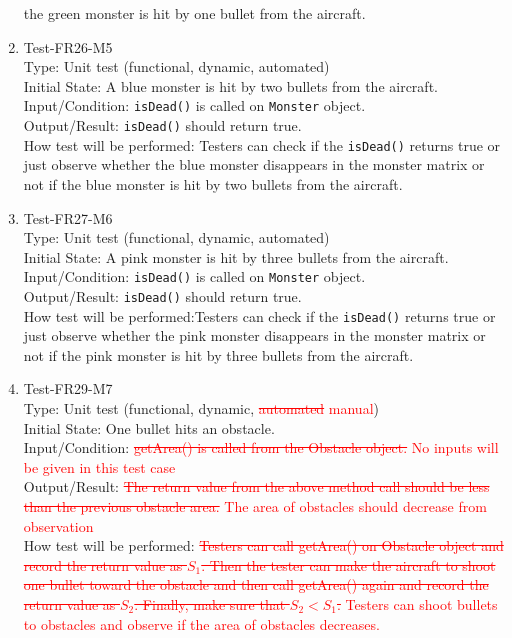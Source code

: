 \documentclass[12pt]{article}
\begin{document}
\begin{enumerate}[1.]
 the green monster is hit by one bullet from the aircraft.
\item Test-FR26-M5\\
Type: Unit test (functional, dynamic, automated)\\
Initial State: A blue monster is hit by two bullets 
from the aircraft.\\
Input/Condition: \verb|isDead()| is called on \verb|Monster| object.\\
Output/Result: \verb|isDead()| should return true.\\
How test will be performed: Testers can check if the \verb|isDead()| returns true or just observe whether the blue monster disappears in the monster matrix or not if
 the blue monster is hit by two bullets from the aircraft.
\item Test-FR27-M6\\
Type: Unit test (functional, dynamic, automated)\\
Initial State: A pink monster is hit by three bullets 
from the aircraft.\\
Input/Condition: \verb|isDead()| is called on \verb|Monster| object.\\
Output/Result: \verb|isDead()| should return true.\\
How test will be performed:Testers can check if the
\verb|isDead()| returns true or just observe whether the 
pink monster disappears in the monster matrix or not if
the pink monster is hit by three bullets from the
aircraft.
\item Test-FR29-M7\\
Type: Unit test (functional, dynamic, \textcolor{red}{\st{automated} manual})\\
Initial State: One bullet hits an obstacle.\\
Input/Condition: \textcolor{red}{\st{getArea() is called from the Obstacle object.}
No inputs will be given in this test case}\\
Output/Result: \textcolor{red}{\st{The return value from the above method call should be less than the previous obstacle area.} The area of obstacles should decrease from
observation}\\ 
How test will be performed: \textcolor{red}{\st{Testers can call getArea() on Obstacle object and record the return value as $S_1$. Then the tester can make the aircraft to shoot one bullet toward the obstacle and then call getArea() again and record the return value as $S_2$. Finally, make sure that $S_2 < S_1$.} Testers can shoot bullets
to obstacles and observe if the area of obstacles decreases.}

\end{enumerate}
\end{document}
